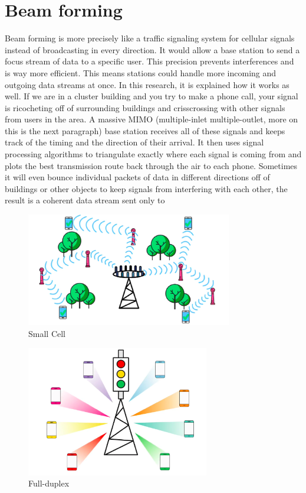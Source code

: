 \section{Beam forming }
Beam forming is more precisely like a traffic signaling system for cellular signals instead of broadcasting in every direction. It would allow a base station to send a focus stream of data to a specific user. This precision prevents interferences and is way more efficient. This means stations could handle more incoming and outgoing data streams at once. In this research, it is explained how it works as well. If we are in a cluster building and you try to make a phone call, your signal is ricocheting off of surrounding buildings and crisscrossing with other signals from users in the area. A massive MIMO (multiple-inlet multiple-outlet, more on this is the next paragraph) base station receives all of these signals and keeps track of the timing and the direction of their arrival. It then uses signal processing algorithms to triangulate exactly where each signal is coming from and plots the best transmission route back through the air to each phone. Sometimes it will even bounce individual packets of data in different directions off of buildings or other objects to keep signals from interfering with each other, the result is a coherent data stream sent only to \\

\begin{figure}[t]
    \centering
    \includegraphics[width=9cm]{Images/small-cell.png}
    \caption{Small Cell}
    \label{fig:my_label}
\end{figure}

\begin{figure}
    \centering
    \includegraphics[width=8cm]{Images/Massive.png}
    \caption{Full-duplex}
    \label{fig:my_label}
\end{figure}\\

